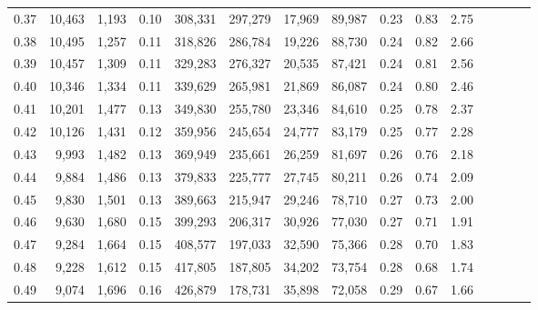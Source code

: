 \begin{tabular}{rrrcrrrrrrrrrrr}
0.37 &  10,463 &  1,193 &                                       0.10 &  308,331 &  297,279 &   17,969 &   89,987 &  0.23 &  0.83 &                         2.75 \\
0.38 &  10,495 &  1,257 &                                       0.11 &  318,826 &  286,784 &   19,226 &   88,730 &  0.24 &  0.82 &                         2.66 \\
0.39 &  10,457 &  1,309 &                                       0.11 &  329,283 &  276,327 &   20,535 &   87,421 &  0.24 &  0.81 &                         2.56 \\
0.40 &  10,346 &  1,334 &                                       0.11 &  339,629 &  265,981 &   21,869 &   86,087 &  0.24 &  0.80 &                         2.46 \\
0.41 &  10,201 &  1,477 &                                       0.13 &  349,830 &  255,780 &   23,346 &   84,610 &  0.25 &  0.78 &                         2.37 \\
0.42 &  10,126 &  1,431 &                                       0.12 &  359,956 &  245,654 &   24,777 &   83,179 &  0.25 &  0.77 &                         2.28 \\
0.43 &   9,993 &  1,482 &                                       0.13 &  369,949 &  235,661 &   26,259 &   81,697 &  0.26 &  0.76 &                         2.18 \\
0.44 &   9,884 &  1,486 &                                       0.13 &  379,833 &  225,777 &   27,745 &   80,211 &  0.26 &  0.74 &                         2.09 \\
0.45 &   9,830 &  1,501 &                                       0.13 &  389,663 &  215,947 &   29,246 &   78,710 &  0.27 &  0.73 &                         2.00 \\
0.46 &   9,630 &  1,680 &                                       0.15 &  399,293 &  206,317 &   30,926 &   77,030 &  0.27 &  0.71 &                         1.91 \\
0.47 &   9,284 &  1,664 &                                       0.15 &  408,577 &  197,033 &   32,590 &   75,366 &  0.28 &  0.70 &                         1.83 \\
0.48 &   9,228 &  1,612 &                                       0.15 &  417,805 &  187,805 &   34,202 &   73,754 &  0.28 &  0.68 &                         1.74 \\
0.49 &   9,074 &  1,696 &                                       0.16 &  426,879 &  178,731 &   35,898 &   72,058 &  0.29 &  0.67 &                         1.66 \\

\end{tabular}
